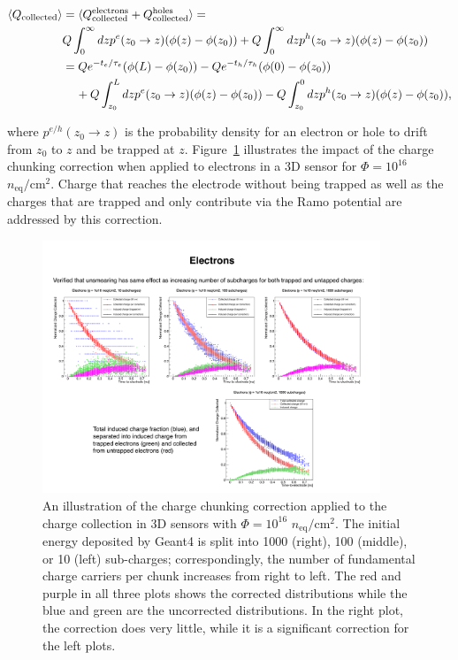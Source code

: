 \begin{align}\nonumber
\label{eq:chukingwithtrapping}
\langle Q_\text{collected}\rangle&=\langle Q_\text{collected}^\text{electrons}+Q_\text{collected}^\text{holes}\rangle=\\\nonumber
&Q\int_0^\infty dz p^e(z_0\rightarrow z) (\phi(z)-\phi(z_0))+Q\int_0^\infty dz p^h(z_0\rightarrow z) (\phi(z)-\phi(z_0))\\\nonumber
&=Qe^{-t_e/\tau_e}(\phi(L)-\phi(z_0))-Qe^{-t_h/\tau_h}(\phi(0)-\phi(z_0))\\
&\hspace{4mm}+Q\int_{z_0}^L dz p^e(z_0\rightarrow z) (\phi(z)-\phi(z_0))-Q\int_{z_0}^0 dz p^h(z_0\rightarrow z) (\phi(z)-\phi(z_0)),
\end{align}

where $p^{e/h}(z_0\rightarrow z)$ is the probability density for an electron or hole to drift from $z_0$ to $z$ and be trapped at $z$.  Figure~\ref{fig:chunking:correction} illustrates the impact of the charge chunking correction when applied to electrons in a 3D sensor for $\Phi=10^{16}$ $n_\text{eq}/\text{cm}^2$.  Charge that reaches the electrode without being trapped as well as the charges that are trapped and only contribute via the Ramo potential are addressed by this correction.

\begin{figure}[!htpb]
\centering
\includegraphics[width=0.9\textwidth]{chunking3D.pdf}
\caption{An illustration of the charge chunking correction applied to the charge collection in 3D sensors with $\Phi=10^{16}$ $n_\text{eq}/\text{cm}^2$.  The initial energy deposited by Geant4 is split into 1000 (right), 100 (middle), or 10 (left) sub-charges; correspondingly, the number of fundamental charge carriers per chunk increases from right to left.  The red and purple in all three plots shows the corrected distributions while the blue and green are the uncorrected distributions.  In the right plot, the correction does very little, while it is a significant correction for the left plots.}
\label{fig:chunking:correction}
\end{figure}

